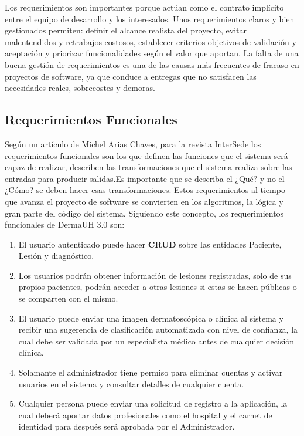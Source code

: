 Los requerimientos son importantes porque actúan como el contrato implícito entre el equipo de desarrollo y los interesados. 
Unos requerimientos claros y bien gestionados permiten: definir el alcance realista del proyecto, 
evitar malentendidos y retrabajos costosos, establecer criterios objetivos de validación y aceptación y
priorizar funcionalidades según el valor que aportan. La falta de una buena gestión de requerimientos 
es una de las causas más frecuentes de fracaso en proyectos de software, ya que conduce a entregas 
que no satisfacen las necesidades reales, sobrecostes y demoras.

\subsection{Requerimientos Funcionales}
Seg\'un un art\'iculo de Michel Arias Chaves, para la revista InterSede \cite{requerimientosFuncionales}
los requerimientos funcionales son los que definen las funciones que el sistema ser\'a capaz de realizar,
describen las transformaciones que el sistema realiza sobre las entradas para producir salidas.Es
importante que se describa el ¿Qué? y no el ¿Cómo? se deben hacer esas transformaciones. Estos
requerimientos al tiempo que avanza el proyecto de software se convierten en los algoritmos, la lógica y
gran parte del código del sistema. Siguiendo este concepto, los requerimientos funcionales de DermaUH 3.0 son:
\begin{enumerate}
    \item[RF1] El usuario autenticado puede hacer \textbf{CRUD} sobre las entidades Paciente, Lesi\'on y diagn\'ostico.
    \item[RF2] Los usuarios podr\'an obtener informaci\'on de lesiones registradas, solo de sus propios pacientes, podr\'an acceder a otras lesiones si estas se hacen p\'ublicas o se comparten con el mismo.
    \item[RF3] El usuario puede enviar una imagen dermatosc\'opica o cl\'inica al sistema y recibir una sugerencia de clasificaci\'on automatizada con nivel de confianza, la cual debe ser validada por un especialista m\'edico antes de cualquier decisi\'on cl\'inica.
    \item[RF4] Solamante el administrador tiene permiso para eliminar cuentas y activar usuarios en el sistema y consultar detalles de cualquier cuenta.
    \item[RF5] Cualquier persona puede enviar una solicitud de registro a la aplicaci\'on, la cual deber\'a aportar datos profesionales como el hospital y el carnet de identidad para despu\'es ser\'a aprobada por el Administrador.
\end{enumerate}

